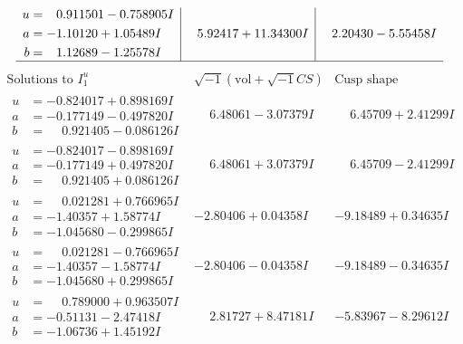 \documentclass[1p]{elsarticle_modified}
\theoremstyle{definition}
\newcommand{\I}{\sqrt{-1}}
\begin{document}
$$\begin{array}{c|c|c}
\begin{aligned}
u &= \phantom{-}0.911501 - 0.758905 I \\
a &= -1.10120 + 1.05489 I \\
b &= \phantom{-}1.12689 - 1.25578 I\end{aligned}
 & \phantom{-}5.92417 + 11.34300 I & \phantom{-}2.20430 - 5.55458 I\\
 \hline 
 \end{array}$$\newpage$$\begin{array}{c|c|c}  
\text{Solutions to }I^u_{1}& \I (\text{vol} + \sqrt{-1}CS) & \text{Cusp shape}\\
 \hline 
\begin{aligned}
u &= -0.824017 + 0.898169 I \\
a &= -0.177149 - 0.497820 I \\
b &= \phantom{-}0.921405 - 0.086126 I\end{aligned}
 & \phantom{-}6.48061 - 3.07379 I & \phantom{-}6.45709 + 2.41299 I \\ \hline\begin{aligned}
u &= -0.824017 - 0.898169 I \\
a &= -0.177149 + 0.497820 I \\
b &= \phantom{-}0.921405 + 0.086126 I\end{aligned}
 & \phantom{-}6.48061 + 3.07379 I & \phantom{-}6.45709 - 2.41299 I \\ \hline\begin{aligned}
u &= \phantom{-}0.021281 + 0.766965 I \\
a &= -1.40357 + 1.58774 I \\
b &= -1.045680 - 0.299865 I\end{aligned}
 & -2.80406 + 0.04358 I & -9.18489 + 0.34635 I \\ \hline\begin{aligned}
u &= \phantom{-}0.021281 - 0.766965 I \\
a &= -1.40357 - 1.58774 I \\
b &= -1.045680 + 0.299865 I\end{aligned}
 & -2.80406 - 0.04358 I & -9.18489 - 0.34635 I \\ \hline\begin{aligned}
u &= \phantom{-}0.789000 + 0.963507 I \\
a &= -0.51131 - 2.47418 I \\
b &= -1.06736 + 1.45192 I\end{aligned}
 & \phantom{-}2.81727 + 8.47181 I & -5.83967 - 8.29612 I \\ \hline\begin{aligned}

\end{aligned}
\end{array}$$
\end{document}
